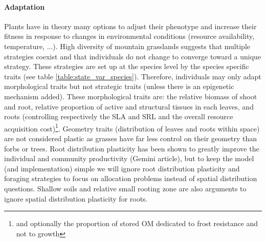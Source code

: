 \documentclass[a4paper,twoside, justified,marginals=raggedright, nobib]{tufte-handout}
\begin{document}
\paragraph{Adaptation} Plants have in theory many options to adjust their phenotype and increase their fitness in response to changes in environmental conditions (resource availability, temperature, ...). High diversity of mountain grasslands suggests that multiple strategies coexist and that individuals do not change to converge toward a unique strategy. These strategies are set up at the species level by the species specific traits (see table \ref{table:state_var_species}). Therefore, individuals may only adapt morphological traits but not strategic traits (unless there is an epigenetic mechanism added). These morphological traits are: the relative biomass of shoot and root, relative proportion of active and structural tissues in each leaves, and roots (controlling respectively the SLA and SRL and the overall resource acquisition cost)\footnote{and optionally the proportion of stored OM dedicated to frost resistance and not to growth}. Geometry traits (distribution of leaves and roots within space) are not considered plastic as grasses have far less control on their geometry than forbs or trees. Root distribution plasticity has been shown to greatly improve the individual and community productivity (Gemini article), but to keep the model (and implementation) simple we will ignore root distribution plasticity and foraging strategies to focus on allocation problems instead of spatial distribution questions. Shallow soils and relative small rooting zone are also arguments to ignore spatial distribution plasticity for roots.
\end{document}
